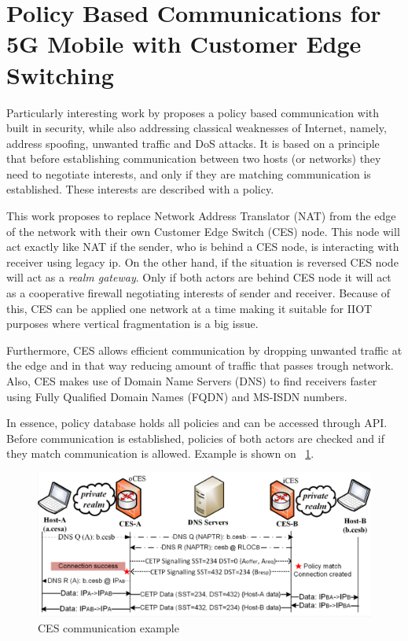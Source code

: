 \section{Policy Based Communications for 5G Mobile with Customer Edge Switching}

Particularly interesting work by \cite{Kantola} proposes a policy based communication with built in security, while also addressing classical weaknesses of Internet, namely, address spoofing, unwanted traffic and DoS attacks. It is based on a principle that before establishing communication between two hosts (or networks) they need to negotiate interests, and only if they are matching communication is established. These interests are described with a policy.

This work proposes to replace Network Address Translator (NAT) from the edge of the network with their own Customer Edge Switch (CES) node. This node will act exactly like NAT if the sender, who is behind a CES node, is interacting with receiver using legacy ip. On the other hand, if the situation is reversed CES node will act as a \emph{realm gateway}. Only if both actors are behind CES node it will act as a cooperative firewall negotiating interests of sender and receiver. Because of this, CES can be applied one network at a time making it suitable for IIOT purposes where vertical fragmentation is a big issue.

Furthermore, CES allows efficient communication by dropping unwanted traffic at the edge and in that way reducing amount of traffic that passes trough network. Also, CES makes use of Domain Name Servers (DNS) to find receivers faster using Fully Qualified Domain Names (FQDN) and MS-ISDN numbers.

In essence, policy database holds all policies and can be accessed through API. Before communication is established, policies of both actors are checked and if they match communication is allowed. Example is shown on ~\ref{fig:PolicyBasedCommunicationExample}.

\begin{figure}[ht]
	\begin{center}
		\includegraphics[width=\textwidth]{images/PolicyBasedCommunicationExample}
		\caption{CES communication example}
		\label{fig:PolicyBasedCommunicationExample}
	\end{center}
\end{figure}

